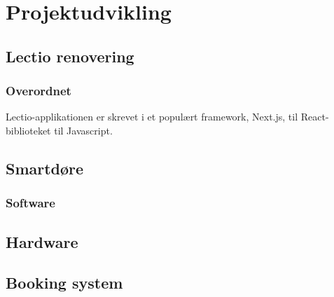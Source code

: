 \section{Projektudvikling \label{sec:Projektudvikling}}
    \subsection{Lectio renovering}
        \subsubsection{Overordnet}
           Lectio-applikationen er skrevet i et populært framework, Next.js, til React-biblioteket til Javascript.
    \subsection{Smartdøre}
        \subsubsection{Software}
        \subsection{Hardware}
    \subsection{Booking system}

